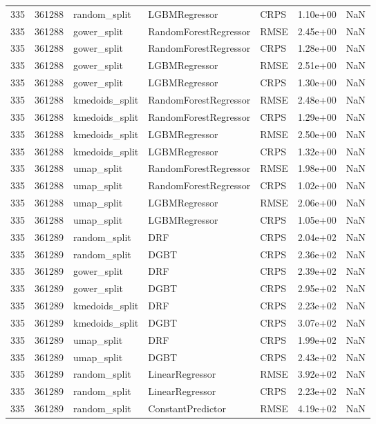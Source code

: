 \begin{tabular}{rrlllrr}
335 & 361288 & random\_split & LGBMRegressor & CRPS & 1.10e+00 & NaN \\
335 & 361288 & gower\_split & RandomForestRegressor & RMSE & 2.45e+00 & NaN \\
335 & 361288 & gower\_split & RandomForestRegressor & CRPS & 1.28e+00 & NaN \\
335 & 361288 & gower\_split & LGBMRegressor & RMSE & 2.51e+00 & NaN \\
335 & 361288 & gower\_split & LGBMRegressor & CRPS & 1.30e+00 & NaN \\
335 & 361288 & kmedoids\_split & RandomForestRegressor & RMSE & 2.48e+00 & NaN \\
335 & 361288 & kmedoids\_split & RandomForestRegressor & CRPS & 1.29e+00 & NaN \\
335 & 361288 & kmedoids\_split & LGBMRegressor & RMSE & 2.50e+00 & NaN \\
335 & 361288 & kmedoids\_split & LGBMRegressor & CRPS & 1.32e+00 & NaN \\
335 & 361288 & umap\_split & RandomForestRegressor & RMSE & 1.98e+00 & NaN \\
335 & 361288 & umap\_split & RandomForestRegressor & CRPS & 1.02e+00 & NaN \\
335 & 361288 & umap\_split & LGBMRegressor & RMSE & 2.06e+00 & NaN \\
335 & 361288 & umap\_split & LGBMRegressor & CRPS & 1.05e+00 & NaN \\
335 & 361289 & random\_split & DRF & CRPS & 2.04e+02 & NaN \\
335 & 361289 & random\_split & DGBT & CRPS & 2.36e+02 & NaN \\
335 & 361289 & gower\_split & DRF & CRPS & 2.39e+02 & NaN \\
335 & 361289 & gower\_split & DGBT & CRPS & 2.95e+02 & NaN \\
335 & 361289 & kmedoids\_split & DRF & CRPS & 2.23e+02 & NaN \\
335 & 361289 & kmedoids\_split & DGBT & CRPS & 3.07e+02 & NaN \\
335 & 361289 & umap\_split & DRF & CRPS & 1.99e+02 & NaN \\
335 & 361289 & umap\_split & DGBT & CRPS & 2.43e+02 & NaN \\
335 & 361289 & random\_split & LinearRegressor & RMSE & 3.92e+02 & NaN \\
335 & 361289 & random\_split & LinearRegressor & CRPS & 2.23e+02 & NaN \\
335 & 361289 & random\_split & ConstantPredictor & RMSE & 4.19e+02 & NaN \\

\end{tabular}
